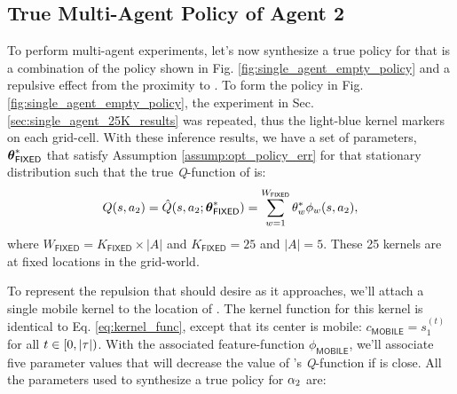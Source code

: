 \subsection{True Multi-Agent Policy of Agent 2} \label{sec:true_agent_2_multi_agent_policy}

    \begin{figure}[htb]
        \begin{center}
        \end{center}
\end{figure}

    To perform multi-agent experiments, let's now synthesize a true policy for  that is a combination of the
    policy shown in Fig. \ref{fig:single_agent_empty_policy} and a repulsive effect from the proximity to . To
    form the policy in Fig. \ref{fig:single_agent_empty_policy}, the experiment in Sec.
    \ref{sec:single_agent_25K_results} was repeated, thus the light-blue kernel markers on each grid-cell. With these
    inference results, we have a set of parameters, $\boldsymbol{\mathbb{\theta}}^*_{\mathsf{FIXED}}$ that satisfy Assumption
    \ref{assump:opt_policy_err} for that stationary distribution such that the true \emph{Q}-function of  is:
    \[
        Q(s,a_2) = \hat{Q}(s,a_2; \boldsymbol{\mathbb{\theta}}^*_{\mathsf{FIXED}})
                 = \sum_{w=1}^{W_{\mathsf{FIXED}}} \theta^*_{w} \phi_{w}(s,a_2),
    \]
    where $W_{\mathsf{FIXED}}=K_{\mathsf{FIXED}}\times |A|$ and $K_{\mathsf{FIXED}}=25$ and $|A|=5$. These 25 kernels
    are at fixed locations in the grid-world.

    To represent the repulsion that  should desire as it  approaches, we'll attach a single mobile
    kernel to the location of . The kernel function for this kernel is identical to Eq. \ref{eq:kernel_func},
    except that its center is mobile: $c_{\mathsf{MOBILE}} = s_1^{(t)}$ for all $t \in [0,|\tau|)$. With the associated
    feature-function $\phi_{\mathsf{MOBILE}}$, we'll associate five parameter values that will decrease the value of
    's \emph{Q}-function if  is close. All the parameters used to synthesize a true policy for
    $\alpha_{2}$ are:


